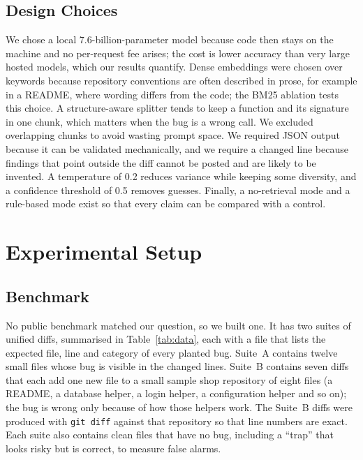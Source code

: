 \documentclass[12pt,onecolumn,draftclsnofoot]{IEEEtran}
\begin{document}
\subsection{Design Choices}
We chose a local 7.6-billion-parameter model because code then stays on the machine and no per-request fee arises; the cost is lower accuracy than very large hosted models, which our results quantify. Dense embeddings were chosen over keywords because repository conventions are often described in prose, for example in a README, where wording differs from the code; the BM25 ablation tests this choice. A structure-aware splitter tends to keep a function and its signature in one chunk, which matters when the bug is a wrong call. We excluded overlapping chunks to avoid wasting prompt space. We required JSON output because it can be validated mechanically, and we require a changed line because findings that point outside the diff cannot be posted and are likely to be invented. A temperature of 0.2 reduces variance while keeping some diversity, and a confidence threshold of 0.5 removes guesses. Finally, a no-retrieval mode and a rule-based mode exist so that every claim can be compared with a control.

\section{Experimental Setup}\label{sec:setup}
\subsection{Benchmark}
No public benchmark matched our question, so we built one. It has two suites of unified diffs, summarised in Table~\ref{tab:data}, each with a file that lists the expected file, line and category of every planted bug. Suite~A contains twelve small files whose bug is visible in the changed lines. Suite~B contains seven diffs that each add one new file to a small sample shop repository of eight files (a README, a database helper, a login helper, a configuration helper and so on); the bug is wrong only because of how those helpers work. The Suite~B diffs were produced with \texttt{git diff} against that repository so that line numbers are exact. Each suite also contains clean files that have no bug, including a ``trap'' that looks risky but is correct, to measure false alarms.
\end{document}
